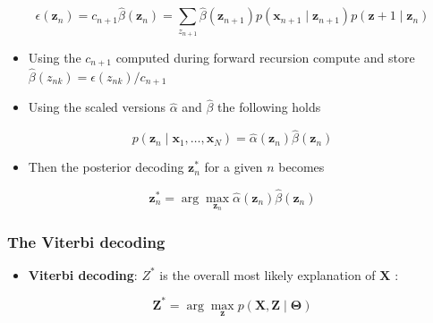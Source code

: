 \documentclass[11pt]{article}
\begin{document}
\begin{equation}
  \epsilon (\pmb z_n) = c_{n+1} \hat \beta(\pmb z_n) = \sum_{z_{n+1}} \hat \beta (\pmb z_{n+1}) p(\pmb x_{n+1} \mid \pmb z_{n+1}) p(\pmb z+1 \mid \pmb z_n)
\end{equation}
\begin{itemize}
\item Using the \(c_{n+1}\) computed during forward recursion compute and store \(\hat \beta (z_{nk}) = \epsilon (z_{nk}) / c_{n+1}\)

\item Using the scaled versions \(\hat \alpha\) and \(\hat \beta\) the following holds
\end{itemize}
\begin{equation}
  p(\pmb z_n \mid \pmb x_1, \dots, \pmb x_N) = \hat \alpha (\pmb z_n) \hat \beta (\pmb z_n)
\end{equation}

\begin{itemize}
\item Then the posterior decoding \(\pmb z_n^*\) for a given \(n\) becomes
\end{itemize}
\begin{equation}
  \pmb z_n^* = \arg \max_{\pmb z_n} \hat \alpha (\pmb z_n)  \hat \beta (\pmb z_n)
\end{equation}

\subsubsection{The Viterbi decoding}
\label{sec:org1eb51ab}
\begin{itemize}
\item \textbf{Viterbi decoding}: \(Z^*\) is the overall most likely explanation of \(\pmb X\) :
\end{itemize}
\begin{equation}
  \pmb Z^* = \arg\max_{\pmb{z}} p(\pmb X, \pmb Z \mid \pmb \Theta)
\end{equation}
\end{document}
